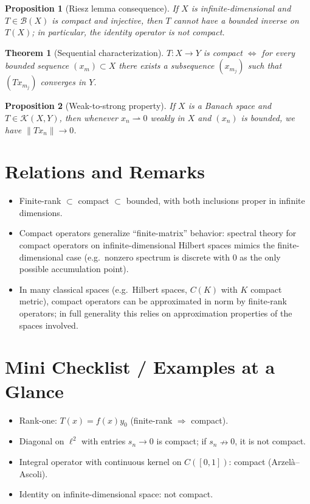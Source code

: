 \documentclass[11pt]{article}
\newtheorem{theorem}{Theorem}
\newtheorem{proposition}{Proposition}
\begin{document}
\begin{proposition}[Riesz lemma consequence]
If $X$ is infinite-dimensional and $T\in\mathcal{B}(X)$ is compact and injective, then $T$ cannot have a bounded inverse on $T(X)$; in particular, the identity operator is not compact.
\end{proposition}

\begin{theorem}[Sequential characterization]
$T:X\to Y$ is compact $\iff$ for every bounded sequence $(x_m)\subset X$ there exists a subsequence $(x_{m_j})$ such that $(Tx_{m_j})$ converges in $Y$.
\end{theorem}

\begin{proposition}[Weak-to-strong property]
If $X$ is a Banach space and $T\in\mathcal{K}(X,Y)$, then whenever $x_n\rightharpoonup 0$ weakly in $X$ and $(x_n)$ is bounded, we have $\|Tx_n\|\to 0$.
\end{proposition}

\section{Relations and Remarks}
\begin{itemize}
  \item Finite-rank $\subset$ compact $\subset$ bounded, with both inclusions proper in infinite dimensions.
  \item Compact operators generalize ``finite-matrix'' behavior: spectral theory for compact operators on infinite-dimensional Hilbert spaces mimics the finite-dimensional case (e.g.\ nonzero spectrum is discrete with $0$ as the only possible accumulation point).
  \item In many classical spaces (e.g.\ Hilbert spaces, $C(K)$ with $K$ compact metric), compact operators can be approximated in norm by finite-rank operators; in full generality this relies on approximation properties of the spaces involved.
\end{itemize}

\section*{Mini Checklist / Examples at a Glance}
\begin{itemize}
  \item Rank-one: $T(x)=f(x)y_0$ (finite-rank $\Rightarrow$ compact).
  \item Diagonal on $\ell^2$ with entries $s_n\to 0$ is compact; if $s_n\nrightarrow 0$, it is not compact.
  \item Integral operator with continuous kernel on $C([0,1])$: compact (Arzel\`a--Ascoli).
  \item Identity on infinite-dimensional space: not compact.
\end{itemize}
\end{document}
